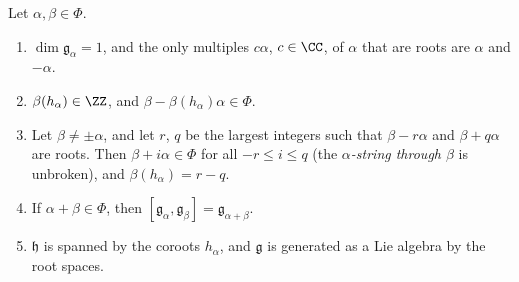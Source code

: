 \begin{theorem}\label{representation-theory:theorem-root-properties}
Let $\alpha, \beta \in \Phi$.
\begin{enumerate}
\item $\dim\mathfrak{g}_\alpha = 1$, and the only multiples $c\alpha$, $c \in \CC$, of $\alpha$ that are roots are $\alpha$ and $-\alpha$.
\item $\beta(h_\alpha) \in \ZZ$, and $\beta - \beta(h_\alpha)\alpha \in \Phi$.
\item Let $\beta \neq \pm\alpha$, and let $r$, $q$ be the largest integers such that $\beta - r\alpha$ and $\beta + q\alpha$ are roots. Then $\beta + i\alpha \in \Phi$ for all
$-r \leq i \leq q$ (the \emph{$\alpha$-string through $\beta$} is unbroken), and $\beta(h_\alpha) = r - q$.
\item If $\alpha + \beta \in \Phi$, then $[\mathfrak{g}_\alpha, \mathfrak{g}_\beta] = \mathfrak{g}_{\alpha + \beta}$.
\item $\mathfrak{h}$ is spanned by the coroots $h_\alpha$, and $\mathfrak{g}$ is generated as a Lie algebra by the root spaces.
\end{enumerate}
\end{theorem}

